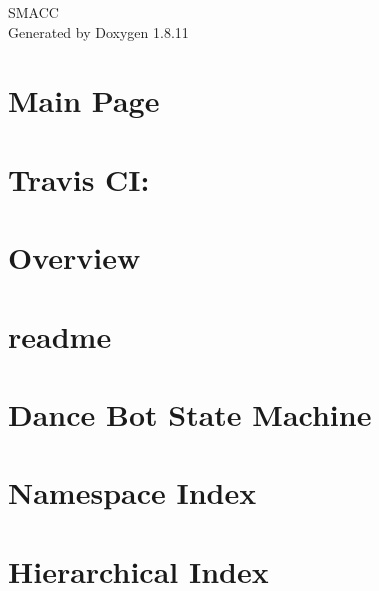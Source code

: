 \documentclass[twoside]{book}
\newcommand{\+}{\discretionary{\mbox{\scriptsize$\hookleftarrow$}}{}{}}
\newcommand{\clearemptydoublepage}{%
  \newpage{\pagestyle{empty}\cleardoublepage}%
}
\begin{document}
\hypersetup{pageanchor=false,
             bookmarksnumbered=true,
             pdfencoding=unicode
            }
\begin{titlepage}
\vspace*{7cm}
\begin{center}%
{\Large S\+M\+A\+CC }\\
\vspace*{1cm}
{\large Generated by Doxygen 1.8.11}\\
\end{center}
\end{titlepage}
\clearemptydoublepage
\tableofcontents
\clearemptydoublepage
{}
\hypersetup{pageanchor=true}

\chapter{Main Page}
\label{index}\hypertarget{index}{}
\chapter{Travis CI\+:}
\label{md_README}
\hypertarget{md_README}{}

\chapter{Overview}
\label{md_rosdoc_lite_README}
\hypertarget{md_rosdoc_lite_README}{}

\chapter{readme}
\label{md_smacc_diagnostics_readme}
\hypertarget{md_smacc_diagnostics_readme}{}

\chapter{Dance Bot State Machine}
\label{md_smacc_sm_examples_sm_dance_bot_launch_readme}
\hypertarget{md_smacc_sm_examples_sm_dance_bot_launch_readme}{}

\chapter{Namespace Index}

\chapter{Hierarchical Index}

\end{document}
